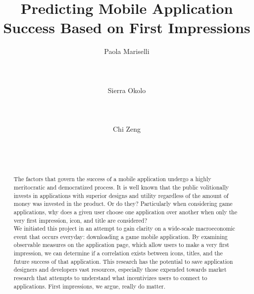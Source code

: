 \documentclass{sigchi}
\begin{document}
\title{Predicting Mobile Application Success Based on First Impressions}

\author{
  \alignauthor Paola Mariselli\\
    \\
    \\
    \\
  \alignauthor Sierra Okolo\\
    \\
    \\
    \\
  \alignauthor Chi Zeng\\
    \\
    \\
    \\
}

\maketitle
\begin{abstract}
The factors that govern the success of a mobile application undergo a highly meritocratic and democratized process. It is well known that the public volitionally invests in applications with superior designs and utility regardless of the amount of money was invested in the product. Or do they? Particularly when considering game applications, why does a given user choose one application over another when only the very first impression, icon, and title are considered? \\

We initiated this project in an attempt to gain clarity on a wide-scale macroeconomic event that occurs everyday: downloading a game mobile application. By examining observable measures on the application page, which allow users to make a very first impression, we can determine if a correlation exists between icons, titles, and the future success of that application. This research has the potential to save application designers and developers vast resources, especially those expended towards market research that attempts to understand what incentivizes users to connect to applications. First impressions, we argue, really do matter.
\end{abstract}











\end{document}
